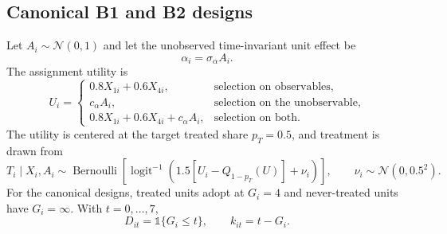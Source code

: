 \documentclass[11pt]{article}
\newcommand{\ind}{\mathbb{1}}
\begin{document}
\subsection{Canonical B1 and B2 designs}

Let $A_i\sim\mathcal{N}(0,1)$ and let the unobserved time-invariant unit
effect be
\begin{equation}
 \alpha_i=\sigma_\alpha A_i.
 \label{eq:alpha}
\end{equation}
The assignment utility is
\begin{equation}
 U_i=
 \begin{cases}
  0.8X_{1i}+0.6X_{4i}, & \text{selection on observables},\\
  c_\alpha A_i, & \text{selection on the unobservable},\\
  0.8X_{1i}+0.6X_{4i}+c_\alpha A_i, & \text{selection on both}.
 \end{cases}
 \label{eq:utility}
\end{equation}
The utility is centered at the target treated share $p_T=0.5$, and treatment
is drawn from
\begin{equation}
 T_i\mid X_i,A_i\sim
 \operatorname{Bernoulli}\!\left[
 \operatorname{logit}^{-1}\!\left(
 1.5\left[U_i-Q_{1-p_T}(U)\right]+\nu_i
 \right)\right],
 \qquad \nu_i\sim\mathcal{N}(0,0.5^2).
 \label{eq:assignment}
\end{equation}
For the canonical designs, treated units adopt at $G_i=4$ and never-treated
units have $G_i=\infty$. With $t=0,\ldots,7$,
\begin{equation}
 D_{it}=\ind\{G_i\le t\},
 \qquad k_{it}=t-G_i.
 \label{eq:canonical-treatment}
\end{equation}
\end{document}
